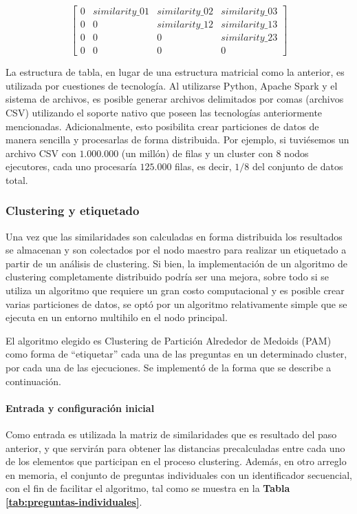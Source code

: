 \[\begin{bmatrix}0 & similarity\_01 & similarity\_02 & similarity\_03 \\ 0 & 0 & similarity\_12 & similarity\_13  \\ 0 & 0  & 0 & similarity\_23  \\ 0 & 0 & 0 & 0 \end{bmatrix}\]

\bigskip La estructura de tabla, en lugar de una estructura matricial como la anterior, es utilizada por cuestiones de tecnología. Al utilizarse Python, Apache Spark y el sistema de archivos, es posible generar archivos delimitados por comas (archivos CSV) utilizando el soporte nativo que poseen las tecnologías anteriormente mencionadas. Adicionalmente, esto posibilita crear particiones de datos de manera sencilla y procesarlas de forma distribuida. Por ejemplo, si tuviésemos un archivo CSV con \(1.000.000\) (un millón) de filas y un cluster con \(8\) nodos ejecutores, cada uno procesaría \(125.000\) filas, es decir, \(1/8\) del conjunto de datos total.

\subsubsection{Clustering y etiquetado}
Una vez que las similaridades son calculadas en forma distribuida los resultados se almacenan y son colectados por el nodo maestro para realizar un etiquetado a partir de un análisis de clustering. Si bien, la implementación de un algoritmo de clustering completamente distribuido podría ser una mejora, sobre todo si se utiliza un algoritmo que requiere un gran costo computacional y es posible crear varias particiones de datos, se optó por un algoritmo relativamente simple que se ejecuta en un entorno multihilo en el nodo principal.

\bigskip El algoritmo elegido es Clustering de Partición Alrededor de Medoids (PAM) como forma de “etiquetar” cada una de las preguntas en un determinado cluster, por cada una de las ejecuciones. Se implementó de la forma que se describe a continuación.

\paragraph{Entrada y configuración inicial}
Como entrada es utilizada la matriz de similaridades que es resultado del paso anterior, y que servirán para obtener las distancias precalculadas entre cada uno de los elementos que participan en el proceso clustering. Además, en otro arreglo en memoria, el conjunto de preguntas individuales con un identificador secuencial, con el fin de facilitar el algoritmo, tal como se muestra en la \textbf{Tabla \ref{tab:preguntas-individuales}}.

